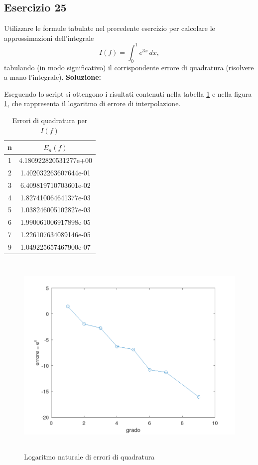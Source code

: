\subsection{Esercizio 25}
Utilizzare le formule tabulate nel precedente esercizio per calcolare le approssimazioni dell'integrale
\[
    I(f) = \int_{0}^{1} e^{3x}\,dx,
\]
tabulando (in modo significativo) il corrispondente errore di quadratura (risolvere a mano l'integrale).
\newline \textbf{Soluzione:}

Eseguendo lo script  si ottengono i risultati contenuti nella tabella \ref{tab:25}
e nella figura \ref{fig:es25}, che rappresenta il logaritmo di errore di interpolazione.
\begin{table}[ht]
    \centering
    \renewcommand\arraystretch{2}
    \begin{tabular}{| c | c |}
        \hline
        n & $E_n(f)$              \\
        \hline
        1 & 4.180922820531277e+00 \\
        2 & 1.402032263607644e-01 \\
        3 & 6.409819710703601e-02 \\
        4 & 1.827410064641377e-03 \\
        5 & 1.038246005102827e-03 \\
        6 & 1.990061006917898e-05 \\
        7 & 1.226107634089146e-05 \\
        9 & 1.049225657467900e-07 \\
        \hline
    \end{tabular}
    \caption{Errori di quadratura per $I(f)$}
    \label{tab:25}
\end{table}
\FloatBarrier
\begin{figure}[!ht]
    \centering
    \includegraphics[width=16cm,height=10cm,keepaspectratio]{capitolo5/es25_figure.png}
    \caption{Logaritmo naturale di errori di quadratura}
    \label{fig:es25}
\end{figure}
\FloatBarrier
